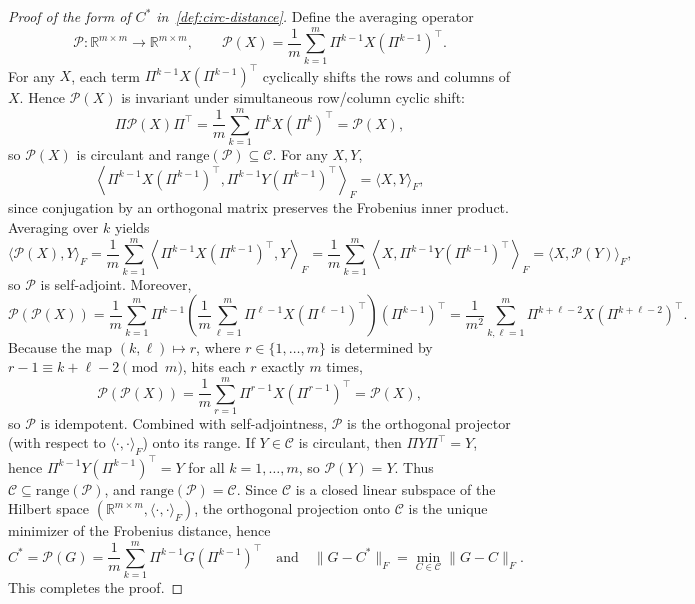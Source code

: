 \documentclass[11pt]{article}
\begin{document}
\begin{proof}[Proof of the form of \(C^*\) in~\cref{def:circ-distance}]
Define the averaging operator
\[
\mathcal{P}:\mathbb{R}^{m\times m}\to\mathbb{R}^{m\times m},
\qquad
\mathcal{P}(X) = \frac{1}{m}\sum_{k=1}^{m}\Pi^{k-1}X(\Pi^{k-1})^{ \top}.
\]
For any \(X\), each term \(\Pi^{k-1}X(\Pi^{k-1})^{ \top}\) cyclically shifts the rows and columns of \(X\).
Hence \(\mathcal{P}(X)\) is invariant under simultaneous row/column cyclic shift:
\[
\Pi \mathcal{P}(X) \Pi^{ \top}
=\frac{1}{m}\sum_{k=1}^{m}\Pi^{k}X(\Pi^{k})^{ \top}
=\mathcal{P}(X),
\]
so \(\mathcal{P}(X)\) is circulant and \(\mathrm{range}(\mathcal{P})\subseteq\mathcal{C}\).
For any \(X,Y\),
\[
\left\langle \Pi^{k-1}X(\Pi^{k-1})^{ \top}, \Pi^{k-1}Y(\Pi^{k-1})^{ \top}\right\rangle_F
=\langle X,Y\rangle_F,
\]
since conjugation by an orthogonal matrix preserves the Frobenius inner product.
Averaging over \(k\) yields
\[
\langle \mathcal{P}(X), Y\rangle_F
=\frac{1}{m}\sum_{k=1}^{m}\left\langle \Pi^{k-1}X(\Pi^{k-1})^{ \top}, Y\right\rangle_F
=\frac{1}{m}\sum_{k=1}^{m}\left\langle X, \Pi^{k-1}Y(\Pi^{k-1})^{ \top}\right\rangle_F
=\langle X, \mathcal{P}(Y)\rangle_F,
\]
so \(\mathcal{P}\) is self-adjoint. Moreover,
\[
\mathcal{P}(\mathcal{P}(X))
=\frac{1}{m}\sum_{k=1}^{m}\Pi^{k-1}\left(\frac{1}{m}\sum_{\ell=1}^{m}\Pi^{\ell-1}X(\Pi^{\ell-1})^{ \top}\right)(\Pi^{k-1})^{ \top}
=\frac{1}{m^2}\sum_{k,\ell=1}^{m}\Pi^{k+\ell-2}X(\Pi^{k+\ell-2})^{ \top}.
\]
Because the map \((k,\ell)\mapsto r\), where \(r\in\{1,\ldots,m\}\) is determined by \(r-1\equiv k+\ell-2\pmod m\), hits each \(r\) exactly \(m\) times,
\[
\mathcal{P}(\mathcal{P}(X))
=\frac{1}{m}\sum_{r=1}^{m}\Pi^{r-1}X(\Pi^{r-1})^{ \top}
=\mathcal{P}(X),
\]
so \(\mathcal{P}\) is idempotent. Combined with self-adjointness, \(\mathcal{P}\) is the orthogonal projector
(with respect to \(\langle\cdot,\cdot\rangle_F\)) onto its range.
If \(Y\in\mathcal{C}\) is circulant, then \(\Pi Y\Pi^{ \top}=Y\), hence
\(\Pi^{k-1}Y(\Pi^{k-1})^{ \top}=Y\) for all \(k=1,\ldots,m\), so \(\mathcal{P}(Y)=Y\).
Thus \(\mathcal{C}\subseteq\mathrm{range}(\mathcal{P})\), and 
\(\mathrm{range}(\mathcal{P})=\mathcal{C}\).
Since \(\mathcal{C}\) is a closed linear subspace of the Hilbert space
\((\mathbb{R}^{m\times m},\langle\cdot,\cdot\rangle_F)\),
the orthogonal projection onto \(\mathcal{C}\) is the unique minimizer of the Frobenius distance, hence
\[
C^*=\mathcal{P}(G)
=\frac{1}{m}\sum_{k=1}^{m}\Pi^{k-1}G(\Pi^{k-1})^{ \top}
\quad\text{and}\quad
\|G-C^*\|_F=\min_{C\in\mathcal{C}}\|G-C\|_F.
\]
This completes the proof.
\end{proof}
\end{document}
